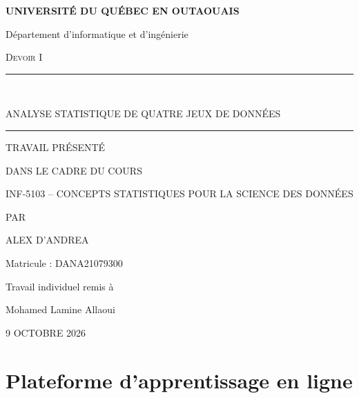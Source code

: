 \documentclass[12pt,letterpaper]{article}
\newcommand{\etudiant}{Alex D'Andrea}
\newcommand{\matricule}{DANA21079300}
\newcommand{\titredev}{Analyse statistique de quatre jeux de données}
\newcommand{\coursdev}{INF-5103 -- Concepts statistiques pour la science des données}
\newcommand{\enseignant}{Mohamed Lamine Allaoui}
\newcommand{\datedev}{9 Octobre 2026}
\begin{document}
\begin{titlepage}
\thispagestyle{empty}
\centering
\vspace*{\fill}

{\MakeUppercase{\bfseries Université du Québec en Outaouais}\par}
\vspace{0.3cm}
{Département d'informatique et d'ingénierie\par}

\vspace{1.5cm}
{\large\scshape Devoir I\par}

\vspace{0.8cm}
\rule{\linewidth}{0.8pt}\\[0.5cm]
{\large\MakeUppercase{\titredev}\par}
\vspace{0.5cm}
\rule{\linewidth}{0.8pt}

\vspace{1.5cm}
TRAVAIL PRÉSENTÉ\par
DANS LE CADRE DU COURS\par
\MakeUppercase{\coursdev}

\vspace{2cm}
PAR\par
\vspace{0.4cm}
{\MakeUppercase{\etudiant}\par}
{Matricule : \matricule\par}

\vspace{1.5cm}
{Travail individuel remis à\par \enseignant\par}

\vspace{1.5cm}
\MakeUppercase{\datedev}

\vspace*{\fill}
\end{titlepage}

\section{Plateforme d'apprentissage en ligne}
\end{document}
